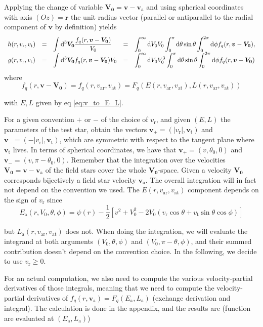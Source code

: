 \documentclass[11pt]{article}
\newcommand{\rt}{\mathrm{t}}
\newcommand{\rr}{\mathrm{r}}
\newcommand{\vr}{v_{\rr}}
\newcommand{\vt}{v_{\rt}}
\newcommand{\bv}{\boldsymbol{v}}
\newcommand{\bvt}{\boldsymbol{\vt}}
\newcommand{\br}{\boldsymbol{r}}
\newcommand{\hr}{\hat{\br}}
\newcommand{\Fq}{F_{q}}
\newcommand{\fq}{f_{q}}
\newcommand{\ra}{\mathrm{a}}
\newcommand{\va}{v_{\ra}}
\newcommand{\bva}{\boldsymbol{\va}}
\newcommand{\bV}[1]{\boldsymbol{V_{#1}}}
\newcommand{\rd}{{\rm{d}}}
\newcommand{\var}{v_{\ra \rr}}
\newcommand{\vat}{v_{\ra \rt}}
\newcommand{\vp}{v_{+}}
\newcommand{\vm}{v_{-}}
\newcommand{\bvp}{\boldsymbol{\vp}}
\newcommand{\bvm}{\boldsymbol{\vm}}
\newcommand{\Ea}{E_{\ra}}
\newcommand{\La}{L_{\ra}}
\begin{document}
Applying the change of variable $\bV0=\bv-\bva$
and using spherical coordinates with axis $(Oz)=\hr$
the unit radius vector (parallel or antiparallel to the radial component
of $\bv$ by definition) yields
\begin{equation}
\begin{array}{cclcl}
  h(r,\vr,\vt) & =&\displaystyle{\int{\rd}^{3}\bV0 \frac{\fq(r,\bv-\bV0)}{V_{0}}} &=& \displaystyle{\int_{0}^{\infty}{\rd}V_{0} V_{0}\int_{0}^{\pi}{\rd}\theta\sin\theta\int_{0}^{2\pi}{\rd}\phi \fq(r,\bv-\bV0)} ,\\
  
  g(r,\vr,\vt) & = &\displaystyle{\int{\rd}^{3}\bV0 \fq(r,\bv-\bV0)V_{0}} &=& \displaystyle{\int_{0}^{\infty}{\rd}V_{0} V_{0}^{3}\int_{0}^{\pi}{\rd}\theta\sin\theta\int_{0}^{2\pi}{\rd}\phi \fq(r,\bv-\bV0)}
\end{array}
\label{eq:Rosenbluth}
\end{equation}
where
\begin{equation}
  \fq(r,\bv-\bV0)=\fq(r,\var,\vat)=\Fq(E(r,\var,\vat),L(r,\var,\vat))
  \label{eq:DFa}
\end{equation}

with $E,L$ given by eq \eqref{eq:v_to_E_L}.

For a given convention $+$ or $-$ of the choice of $\vr$, and
given $(E,L)$ the parameters of the test star, obtain the vectors
$\bvp=(|\vr|,\bvt)$ and $\bvm=(-|\vr|,\bvt)$,
which are symmetric with respect to the tangent plane where $\bvt$
lives. In terms of spherical coordinates, we have that $\bvp=(v,\theta_{0},0)$
and $\bvm=(v,\pi-\theta_{0},0)$. Remember that the
integration over the velocities $\bV0=\bv-\bva$ of
the field stars cover the whole $\boldsymbol{V_{0}}$-space. Given
a velocity $\bV0$ corresponds bijectively a field star
velocity $\bva$. The overall integration will in fact not depend on the convention we used. The $E(r,\var,\vat)$ component depends on the sign of $\vr$ since
\begin{equation}
  \Ea(r,V_{0},\theta,\phi)=\psi(r)-\frac{1}{2}\left[v^{2}+V_{0}^{2}-2V_{0}(\vr\cos\theta+\vt\sin\theta\cos\phi)\right]
  \label{eq:Ea}
\end{equation}

but $\La(r,\var,\vat)$ does not. When doing the integration, we will evaluate the integrand at both arguments $(V_{0},\theta,\phi)$ and  $(V_{0},\pi-\theta,\phi)$, and their summed contribution doesn't depend on the convention choice. In the following, we decide to use $\vr\geq 0$.

For an actual computation, we also
need to compute the various velocity-partial derivatives of those
integrals, meaning that we need to compute the velocity-partial derivatives
of $\fq(r,\bva)=\Fq(\Ea,\La)$ (exchange
derivation and integral). The calculation is done in the appendix,
and the results are (function are evaluated at $(\Ea,\La)$)
\end{document}
